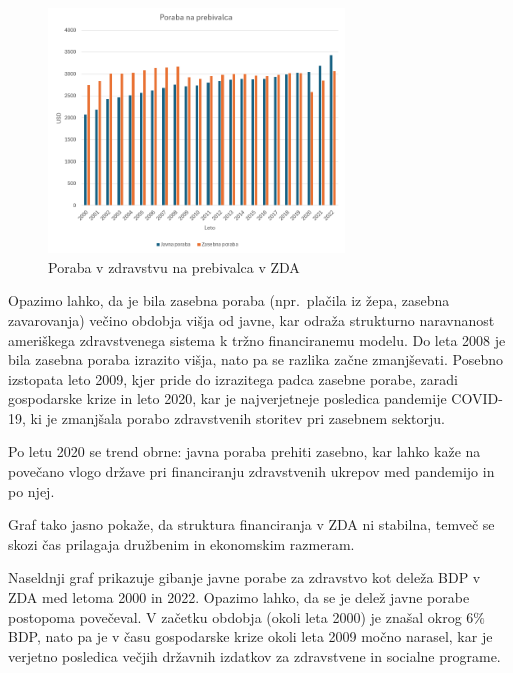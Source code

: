 \documentclass[12pt,a4paper]{article}
\theoremstyle{definition}
\begin{document}
\begin{figure}[H]
    \centering
    \includegraphics[width=0.7\textwidth]{zda_poraba_na_prebivalca.png}
    \caption{Poraba v zdravstvu na prebivalca v ZDA}
    \label{fig:zda_poraba_na_prebivalca}
\end{figure}

Opazimo lahko, da je bila zasebna poraba (npr.\ plačila iz žepa, zasebna zavarovanja) večino obdobja višja od javne, 
kar odraža strukturno naravnanost ameriškega zdravstvenega sistema k tržno financiranemu modelu. 
Do leta 2008 je bila zasebna poraba izrazito višja, nato pa se razlika začne zmanjševati. 
Posebno izstopata leto 2009, kjer pride do izrazitega padca zasebne porabe, zaradi gospodarske krize in leto 2020, 
kar je najverjetneje posledica pandemije COVID-19, ki je zmanjšala porabo zdravstvenih storitev pri zasebnem sektorju.

Po letu 2020 se trend obrne: javna poraba prehiti zasebno, 
kar lahko kaže na povečano vlogo države pri financiranju zdravstvenih ukrepov med pandemijo in po njej. 

Graf tako jasno pokaže, da struktura financiranja v ZDA ni stabilna, 
temveč se skozi čas prilagaja družbenim in ekonomskim razmeram.

Naseldnji graf prikazuje gibanje javne porabe za zdravstvo kot deleža BDP v ZDA med letoma 2000 in 2022. 
Opazimo lahko, da se je delež javne porabe postopoma povečeval. 
V začetku obdobja (okoli leta 2000) je znašal okrog $6 \%$ BDP, 
nato pa je v času gospodarske krize okoli leta 2009 močno narasel, 
kar je verjetno posledica večjih državnih izdatkov za zdravstvene in socialne programe.
\end{document}
